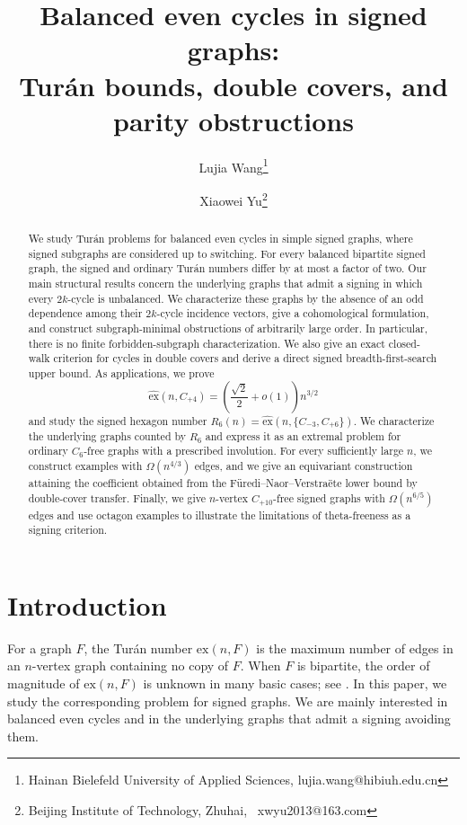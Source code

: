\documentclass{article}
\title{Balanced even cycles in signed graphs:\\
Tur\'an bounds, double covers, and parity obstructions}
\author{Lujia Wang\thanks{Hainan Bielefeld University of Applied Sciences, lujia.wang@hibiuh.edu.cn}
\and Xiaowei Yu\thanks{Beijing Institute of Technology, Zhuhai, \ xwyu2013@163.com}}
\date{}
\newcommand{\ex}{\mathrm{ex}}
\newcommand{\hex}{\widehat{\ex}}
\theoremstyle{definition}
\theoremstyle{remark}
\begin{document}
\maketitle

\begin{abstract}
We study Tur\'an problems for balanced even cycles in simple signed graphs,
where signed subgraphs are considered up to switching.  For every balanced
bipartite signed graph, the signed and ordinary Tur\'an numbers differ by at
most a factor of two.  Our main structural results concern the underlying
graphs that admit a signing in which every $2k$-cycle is unbalanced.  We
characterize these graphs by the absence of an odd dependence among their
$2k$-cycle incidence vectors, give a cohomological formulation, and construct
subgraph-minimal obstructions of arbitrarily large order.  In particular,
there is no finite forbidden-subgraph characterization.  We also give an
exact closed-walk criterion for cycles in double covers and derive
a direct signed breadth-first-search upper bound.
As applications, we prove
\[
\hex(n,C_{+4})=\left(\frac{\sqrt2}{2}+o(1)\right)n^{3/2}
\]
and study the signed hexagon number
$R_6(n)=\hex(n,\{C_{-3},C_{+6}\})$.  We characterize the underlying graphs
counted by $R_6$ and express it as an extremal problem for ordinary
$C_6$-free graphs with a prescribed involution.  For every sufficiently
large $n$, we construct examples with $\Omega(n^{4/3})$ edges, and we give
an equivariant construction attaining
the coefficient obtained from the F\"uredi--Naor--Verstra\"ete lower bound
by double-cover transfer.  Finally, we give $n$-vertex $C_{+10}$-free signed
graphs with $\Omega(n^{6/5})$ edges and use octagon examples to illustrate the limitations of
theta-freeness as a signing criterion.
\end{abstract}

\section{Introduction}\label{sec:introduction}

For a graph $F$, the Tur\'an number $\ex(n,F)$ is the maximum number of
edges in an $n$-vertex graph containing no copy of $F$.  When $F$ is
bipartite, the order of magnitude of $\ex(n,F)$ is unknown in many basic
cases; see \cite{FurediSimonovits2013}.  In this paper, we study the
corresponding problem for signed graphs.
We are mainly interested in balanced even cycles and in
the underlying graphs that admit a signing avoiding them.
\end{document}
